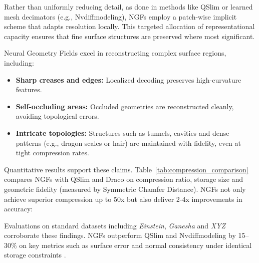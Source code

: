 Rather than uniformly reducing detail, as done in methods like QSlim or learned mesh decimators (e.g., Nvdiffmodeling), NGFs employ a patch-wise implicit scheme that adapts resolution locally. 
This targeted allocation of representational capacity ensures that fine surface structures are preserved where most significant. 

Neural Geometry Fields excel in reconstructing complex surface regions, including:
\begin{itemize}
    \item \textbf{Sharp creases and edges:} Localized decoding preserves high-curvature features.
    \item \textbf{Self-occluding areas:} Occluded geometries are reconstructed cleanly, avoiding topological errors.
    \item \textbf{Intricate topologies:} Structures such as tunnels, cavities and dense patterns (e.g., dragon scales or hair) are maintained with fidelity, even at tight compression rates.
\end{itemize}

Quantitative results support these claims. 
Table~\ref{tab:compression_comparison} compares NGFs with QSlim and Draco on compression ratio, storage size and geometric fidelity (measured by Symmetric Chamfer Distance). 
NGFs not only achieve superior compression up to 50x but also deliver 2-4x improvements in accuracy: 

\begin{table}[h]
\caption{Compression vs. reconstruction fidelity. Chamfer Distances are scaled by $10^5$ and normalized by the bounding box diagonal.}
\centering
{}
\label{tab:compression_comparison}
\end{table}

Evaluations on standard datasets including \textit{Einstein}, \textit{Ganesha} and \textit{XYZ} corroborate these findings. 
NGFs outperform QSlim and Nvdiffmodeling by 15--30\% on key metrics such as surface error and normal consistency under identical storage constraints \cite{sivaram2024}.

